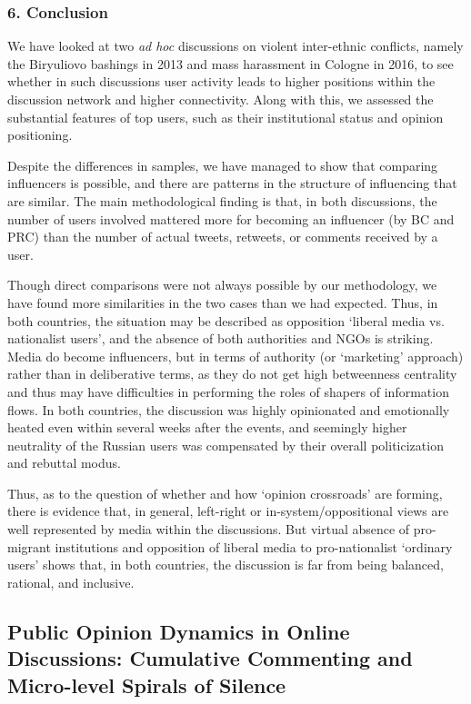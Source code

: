 \subsubsection{6. Conclusion}

We have looked at two \textit{ad hoc} discussions on violent inter-ethnic conflicts, namely the Biryuliovo bashings in 2013 and mass harassment in Cologne in 2016, to see whether in such discussions user activity leads to higher positions within the discussion network and higher connectivity. Along with this, we assessed the substantial features of top users, such as their institutional status and opinion positioning.

Despite the differences in samples, we have managed to show that comparing influencers is possible, and there are patterns in the structure of influencing that are similar. The main methodological finding is that, in both discussions, the number of users involved mattered more for becoming an influencer (by BC and PRC) than the number of actual tweets, retweets, or comments received by a user.

Though direct comparisons were not always possible by our methodology, we have found more similarities in the two cases than we had expected. Thus, in both countries, the situation may be described as opposition ‘liberal media vs. nationalist users’, and the absence of both authorities and NGOs is striking. Media do become influencers, but in terms of authority (or ‘marketing’ approach) rather than in deliberative terms, as they do not get high betweenness centrality and thus may have difficulties in performing the roles of shapers of information flows. In both countries, the discussion was highly opinionated and emotionally heated even within several weeks after the events, and seemingly higher neutrality of the Russian users was compensated by their overall politicization and rebuttal modus.

Thus, as to the question of whether and how ‘opinion crossroads’ are forming, there is evidence that, in general, left-right or in-system/oppositional views are well represented by media within the discussions. But virtual absence of pro-migrant institutions and opposition of liberal media to pro-nationalist ‘ordinary users’ shows that, in both countries, the discussion is far from being balanced, rational, and inclusive.

\subsection{Public Opinion Dynamics in Online Discussions: Cumulative Commenting and Micro-level Spirals of Silence}\label{subsec:ch2/sec4/sub5}

